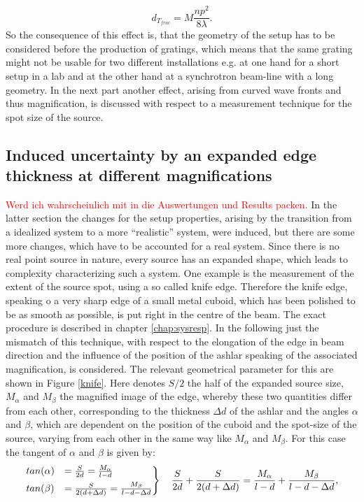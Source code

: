 \begin{equation}
d_{T_{frac}} = M \frac{n p^{2}}{8 \lambda}.
\end{equation}
So the consequence of this effect is, that the geometry of the setup has to be considered before the production of gratings, which means that the same grating might not be usable for two different installations e.g. at one hand for a short setup in a lab and at the other hand at a synchrotron beam-line with a long geometry. In the next part another effect, arising from curved wave fronts and thus magnification, is discussed with respect to a measurement technique for the spot size of the source.   
\subsection{Induced uncertainty by an expanded edge thickness at different magnifications}\label{subsec:weth}
\textcolor{red}{Werd ich wahrscheinlich mit in die Auswertungen und Results packen.}
In the latter section the changes for the setup properties, arising by the transition from a idealized system to a more \enquote{realistic} system, were induced, but there are some more changes, which have to be accounted for a real system. Since there is no real point source in nature, every source has an expanded shape, which leads to complexity characterizing such a system. One example is the measurement of the extent of the source spot, using a so called knife edge. Therefore the knife edge, speaking o a very sharp edge of a small metal cuboid, which has been polished to be as smooth as possible, is put right in the centre of the beam. The exact procedure is described in chapter \ref{chap:sysresp}. In the following just the mismatch of this technique, with respect to the elongation of the edge in beam direction and the influence of the position of the ashlar speaking of the associated magnification, is considered. The relevant geometrical parameter for this are shown in Figure \ref{knife}. Here denotes $S/2$ the half of the expanded source size, $M_{\alpha}$ and $M_{\beta}$ the magnified image of the edge, whereby these two quantities differ from each other, corresponding to the thickness $\Delta d $ of the ashlar and the angles $\alpha$ and $\beta$, which are dependent on the position of the cuboid and the spot-size of the source, varying from each other in the same way like $M_{\alpha}$ and $M_{\beta}$. For this case the tangent of $\alpha$ and $\beta$ is given by:
\begin{equation} \label{tan}
\begin{rcases} 
tan(\alpha) &= \frac{S}{2d} = \frac{M_{\alpha}}{l-d} \\
tan(\beta) &= \frac{S}{2(d + \Delta d)} = \frac{M_{\beta}}{l-d-\Delta d} 	
\end{rcases} \quad \frac{S}{2d} +\frac{S}{2(d + \Delta d)} = \frac{M_{\alpha}}{l -d} + \frac{M_{\beta}}{l -d- \Delta d}, 
\end{equation}

